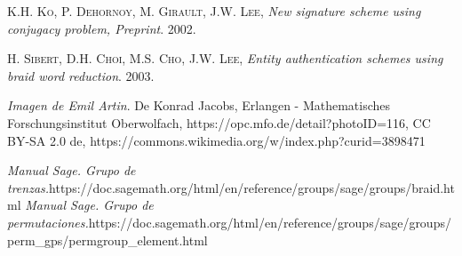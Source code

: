 \documentclass[12pt]{book}
\theoremstyle{definition}
\begin{document}
\begin{thebibliography}{X}
\textsc{K.H. Ko}, \textsc{P. Dehornoy}, \textsc{M. Girault}, \textsc{J.W. Lee}, \textit{New signature scheme using conjugacy problem, Preprint}. 2002.

\textsc{H. Sibert}, \textsc{D.H. Choi}, \textsc{M.S. Cho}, \textsc{J.W. Lee}, \textit{Entity authentication schemes using braid word reduction}. 2003.

\textit{Imagen de Emil Artin}. De Konrad Jacobs, Erlangen - Mathematisches Forschungsinstitut Oberwolfach, https://opc.mfo.de/detail?photoID=116, CC BY-SA 2.0 de, https://commons.wikimedia.org/w/index.php?curid=3898471


\textit{Manual Sage. Grupo de trenzas.}\newline https://doc.sagemath.org/html/en/reference/groups/sage/groups/braid.html
 \textit{Manual Sage. Grupo de permutaciones.}\newline https://doc.sagemath.org/html/en/reference/groups/sage/groups/perm\_gps/\newline permgroup\_element.html
\end{thebibliography}













		
\end{document}

